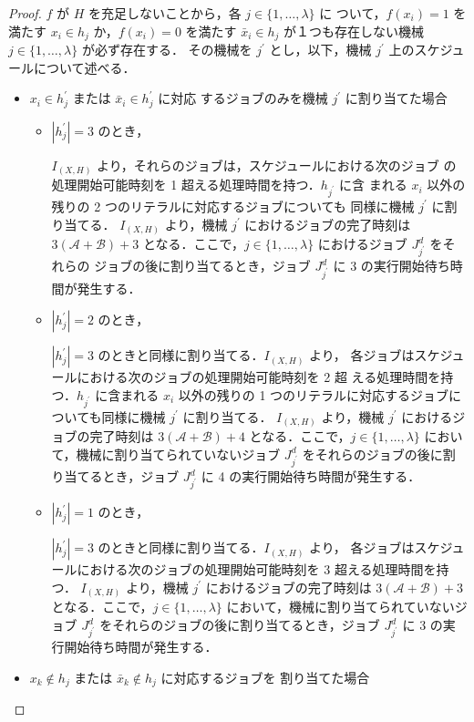\documentclass[12pt]{optlab-bachelor}
\begin{document}
\begin{proof}
  $f$ が $H$ を充足しないことから，各 $j \in \{1, \ldots, \lambda \}$ に
  ついて，$f(x_i) = 1$ を満たす $x_i \in h_j$ か，$f(x_i) = 0$ を満たす
  $\bar x_i \in h_j$ が１つも存在しない機械 $j \in \{1,\ldots, \lambda\}$ が必ず存在する．
  その機械を $j^{\prime}$ とし，以下，機械 $j^{\prime}$ 上のスケジュールについて述べる．
  \begin{itemize}
    \item $x_i \in h_j^{\prime}$ または $\bar x_i \in h_j^{\prime}$ に対応
    するジョブのみを機械 $j^{\prime}$ に割り当てた場合
    \begin{itemize}
      \item $|h_j^{\prime}| = 3$ のとき，

      $I_{(X,H)}$ より，それらのジョブは，スケジュールにおける次のジョブ
      の処理開始可能時刻を 1 超える処理時間を持つ．$h_{j^{\prime}}$ に含
      まれる $x_i$ 以外の残りの 2 つのリテラルに対応するジョブについても
      同様に機械 $j^{\prime}$ に割り当てる．
      $I_{(X,H)}$ より，機械 $j^{\prime}$ におけるジョブの完了時刻は
      $3(\mathcal{A} + \mathcal{B}) + 3$ となる．ここで，$j \in
      \{1,\ldots,\lambda\}$ におけるジョブ $J^d_{j^{\prime}}$ をそれらの
      ジョブの後に割り当てるとき，ジョブ $J^d_{j^{\prime}}$ に 3 の実行開始待ち時間が発生する．
      \item $|h_j^{\prime}| = 2$ のとき，

      $|h_j^{\prime}| = 3$ のときと同様に割り当てる．$I_{(X,H)}$ より，
      各ジョブはスケジュールにおける次のジョブの処理開始可能時刻を 2 超
      える処理時間を持つ．$h_{j^{\prime}}$ に含まれる $x_i$ 以外の残りの
      1 つのリテラルに対応するジョブについても同様に機械 $j^{\prime}$ に割り当てる．
      $I_{(X,H)}$ より，機械 $j^{\prime}$ におけるジョブの完了時刻は
      $3(\mathcal{A} + \mathcal{B}) + 4$ となる．ここで，$j \in
      \{1,\ldots,\lambda\}$ において，機械に割り当てられていないジョブ
      $J^d_{j^{\prime}}$ をそれらのジョブの後に割り当てるとき，ジョブ
      $J^d_{j^{\prime}}$ に 4 の実行開始待ち時間が発生する．
      \item  $|h_j^{\prime}| = 1$ のとき，

      $|h_j^{\prime}| = 3$ のときと同様に割り当てる．$I_{(X,H)}$ より，
      各ジョブはスケジュールにおける次のジョブの処理開始可能時刻を 3 超える処理時間を持つ．
      $I_{(X,H)}$ より，機械 $j^{\prime}$ におけるジョブの完了時刻は
      $3(\mathcal{A} + \mathcal{B}) + 3$ となる．ここで，$j \in
      \{1,\ldots,\lambda\}$ において，機械に割り当てられていないジョブ
      $J^d_{j^{\prime}}$ をそれらのジョブの後に割り当てるとき，ジョブ
      $J^d_{j^{\prime}}$ に 3 の実行開始待ち時間が発生する．
    \end{itemize}
    \item $x_k \notin h_j$ または $\bar x_k \notin h_j$ に対応するジョブを
    割り当てた場合


\end{itemize}
\end{proof}
\end{document}
